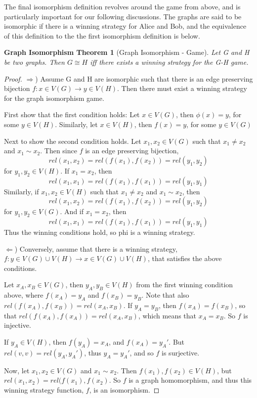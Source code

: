 \documentclass[12pt]{article}
\newtheorem{GraphIsomorphism}{Graph Isomorphism Theorem}
\theoremstyle{definition}
\begin{document}
The final isomorphism definition revolves around the game from above, and is particularly important for our following discussions. The graphs are said to be isomorphic if there is a winning strategy for Alice and Bob, and the equivalence of this definition to the the first isomorphism definition is below.

\begin{GraphIsomorphism}[Graph Isomorphism - Game]
Let G and H be two graphs. Then $G \cong H$ iff there exists a winning strategy for the G-H game.
\end{GraphIsomorphism}

\begin{proof}
$\Rightarrow$) Assume G and H are isomorphic such that there is an edge preserving bijection $f: x \in V(G) \to y \in V(H)$. Then there must exist a winning strategy for the graph isomorphism game. 

First show that the first condition holds: Let $x \in V(G)$, then $\phi(x) = y$, for some $y \in V(H)$. Similarly, let $x \in V(H)$, then $f(x) = y$, for some $y \in V(G)$

Next to show the second condition holds. Let $x_1, x_2 \in V(G)$ such that $x_1 \neq x_2$ and $x_1 \sim x_2$. Then since $f$ is an edge preserving bijection, 
\begin{equation}
rel(x_1, x_2) = rel(f(x_1), f(x_2)) = rel(y_1, y_2)
\end{equation}
for $y_1, y_2 \in V(H)$. If $x_1 = x_2$, then 
\begin{equation}
rel(x_1, x_1) = rel(f(x_1), f(x_1)) = rel(y_1, y_1)
\end{equation}
Similarly, if $x_1, x_2 \in V(H)$ such that $x_1 \neq x_2$ and $x_1 \sim x_2$, then  
\begin{equation}
rel(x_1, x_2) = rel(f(x_1), f(x_2)) = rel(y_1, y_2)
\end{equation}
for $y_1, y_2 \in V(G)$. And if $x_1 = x_2$, then 
\begin{equation}
rel(x_1, x_1) = rel(f(x_1), f(x_1)) = rel(y_1, y_1)
\end{equation}
Thus the winning conditions hold, so phi is a winning strategy.

$\Leftarrow$) Conversely, assume that there is a winning strategy, $f: y \in V(G)\cup V(H) \to x \in V(G) \cup V(H)$, that satisfies the above conditions. 

Let $x_A, x_B \in V(G)$, then $y_A, y_B \in V(H)$ from the first winning condition above, where $f(x_A) = y_A$ and $f(x_B) = y_B$. Note that also $rel(f(x_A), f(x_B)) = rel(x_A, x_B)$. If $y_A = y_B$, then $f(x_A) = f(x_B)$, so that $rel(f(x_A), f(x_A)) = rel(x_A, x_B)$, which means that $x_A = x_B$. So $f$ is injective. 

If $y_A \in V(H)$, then $f(y_A) = x_A$, and $f(x_A) = y_A'$. But $rel(v, v) = rel(y_A, y_A')$, thus $y_A = y_A'$, and so $f$ is surjective. 

Now, let $x_1, x_2 \in V(G)$ and $x_1 \sim x_2$. Then $f(x_1), f(x_2) \in V(H)$, but $rel(x_1, x_2) = rel(f(x_1), f(x_2)$. So $f$ is a  graph homomorphism, and thus this winning strategy function, $f$, is an isomorphism.

\end{proof}
\end{document}
